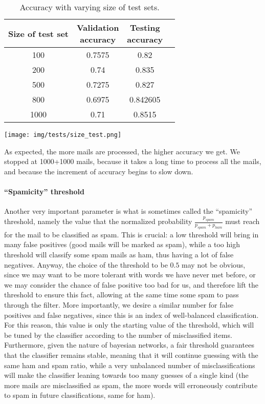 \begin{center}
\begin{table}[h]
\begin{minipage}{.5\linewidth}
\begin{tabular}{cccc}
\toprule
Size of test set & \shortstack{Validation\\ accuracy} & \shortstack{Testing\\ accuracy}\\
\midrule
100  & 0.7575 & 0.82     \\
200  & 0.74   & 0.835    \\
500  & 0.7275 & 0.827    \\
800  & 0.6975 & 0.842605 \\
1000 & 0.71   & 0.8515   \\
\bottomrule
\end{tabular}
\end{minipage}
\begin{minipage}{.5\linewidth}
\texttt{[image: img/tests/size\_test.png]}
    \label{fig:sizetest}
\end{minipage}
\caption{Accuracy with varying size of test sets.}
\end{table}
\label{tab:sizetest}
\end{center}

As expected, the more mails are processed, the higher accuracy we get. We stopped at 1000+1000 mails, because it takes a long time to process all the mails, and because the increment of accuracy begins to slow down.

\paragraph{``Spamicity'' threshold}
\label{spamthrtest} Another very important parameter is what is sometimes called the ``spamicity'' threshold, namely the value that the normalized probability $\frac{p_{spam}}{p_{spam} + p_{ham}}$ must reach for the mail to be classified as spam. This is crucial: a low threshold will bring in many false positives (good mails will be marked as spam), while a too high threshold will classify some spam mails as ham, thus having a lot of false negatives. Anyway, the choice of the threshold to be $0.5$ may not be obvious, since we may want to be more tolerant with words we have never met before, or we may consider the chance of false positive too bad for us, and therefore lift the threshold to ensure this fact, allowing at the same time some spam to pass through the filter. More importantly, we desire a similar number for false positives and false negatives, since this is an index of well-balanced classification. For this reason, this value is only the starting value of the threshold, which will be tuned by the classifier according to the number of misclassified items. Furthermore, given the nature of bayesian networks, a fair threshold guarantees that the classifier remains stable, meaning that it will continue guessing with the same ham and spam ratio, while a very unbalanced number of misclassifications will make the classifier leaning towards too many guesses of a single kind (the more mails are misclassified as spam, the more words will erroneously contribute to spam in future classifications, same for ham).

